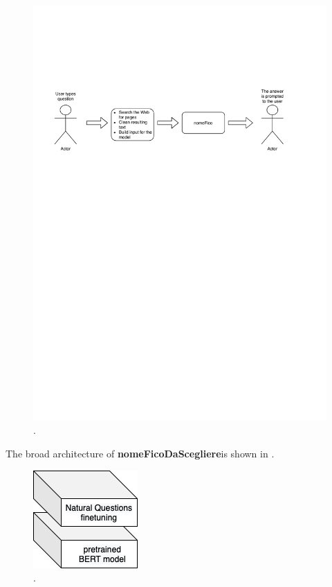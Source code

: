 \documentclass[12pt,a4paper,hidelinks]{article}
\newcommand{\nomefico}{\textbf{nomeFicoDaScegliere}}
\begin{document}
\begin{figure}[ht!]
    \centering
    \includegraphics[width=\textwidth]{report/pics/tool_dataflow.pdf}
    \caption{.}
    \label{fig:application_dataflow}
\end{figure}

The broad architecture of \nomefico is shown in .

\begin{figure}[ht!]
    \centering
    \includegraphics[scale=.9]{pics/broad_architecture.png}
    \caption{.}
    \label{fig:broad_architecture}
\end{figure}
\end{document}
